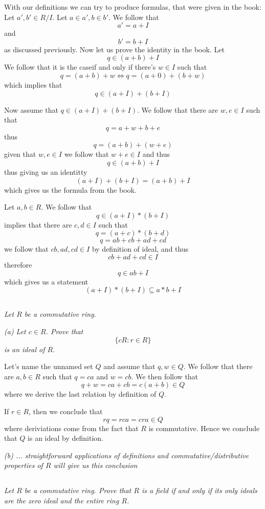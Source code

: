 \documentclass[11pt,oneside,titlepage]{book}
\DeclareMathOperator \lra {\Leftrightarrow}
\newcommand{\set}[1]{\{ #1 \}}
\begin{document}
With our definitions we can try to produce formulas, that were
given in the book:
Let $a', b' \in R/I$.  Let $a \in a', b \in b'$. We follow that
$$a' = a + I$$
and
$$b' = b + I$$
as discussed previously. Now let us prove the identity in the book. Let
$$q \in (a + b) + I$$
We follow that it is the caseif and only if there's $w \in I$ such that
$$q = (a + b) + w \lra q = (a + 0) + (b + w)$$
which implies that
$$q \in (a + I) + (b + I)$$

Now assume that $q \in (a + I) + (b + I)$. We follow that there are
$w, e \in I$ such that
$$q = a + w + b + e$$
thus
$$q = (a + b) + (w + e)$$
given  that $w, e \in I$ we follow that $w + e \in I$ and thus
$$q \in (a + b) + I$$
thus giving us an identitty
$$(a + I) + (b + I) = (a + b) + I$$
which gives us the formula from the book.

Let $a, b \in R$. We follow that
$$q \in (a + I)  * (b + I)$$
implies that there are $c, d \in I$ such that
$$q = (a + c) * (b + d)$$
$$q = ab + cb + ad + cd$$
we follow that $cb, ad, cd \in I$ by definition of ideal, and thus
$$cb + ad + cd \in I$$
therefore
$$q \in ab + I$$
which gives us a statement
$$(a + I)  * (b + I) \subseteq a * b + I$$


\subsection{}

\textit{Let $R$ be a commutative ring.}

\textit{(a) Let $c \in R$. Prove that
  $$\set{cR: r \in R}$$
  is an ideal of $R$.
}

Let's name the unnamed set $Q$ and assume that $q, w \in Q$. We follow that
there are $a, b \in R$ such that $q = ca$ and $w = cb$. We then follow that
$$q + w = ca + cb = c(a + b) \in Q$$
where we derive the last relation by definition of $Q$.

If $r \in R$, then we conclude that
$$rq = rca = cra \in Q$$
where deriviations come from the fact that $R$ is commutative. Hence we conclude that
$Q$ is an ideal by definition. 

\textit{(b) ... straightforward applications of definitions and
commutative/distributive properties of $R$ will give us this
conclusion}

\subsection{}

\textit{Let $R$ be a commutative ring. Prove that $R$ is a field if
and only if its only ideals are the zero ideal and the entire ring
$R$.}
\end{document}
